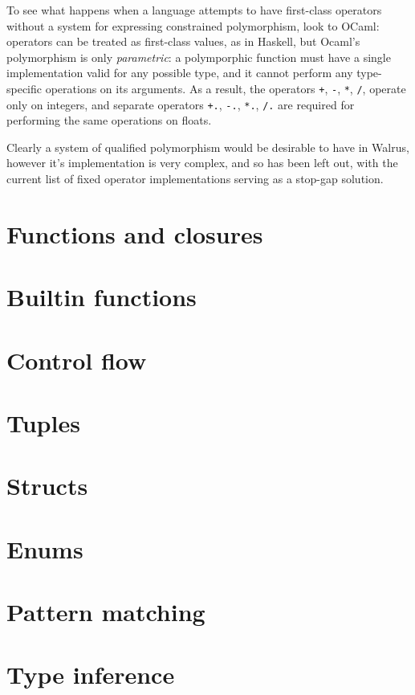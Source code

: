 To see what happens when a language attempts to have first-class operators without a system for expressing
constrained polymorphism, look to OCaml: operators can be treated as first-class values, as in Haskell,
but Ocaml's polymorphism is only \textit{parametric}: a polymporphic function must have a single
implementation valid for any possible type, and it cannot perform any type-specific operations
on its arguments. As a result, the operators \texttt{+}, \texttt{-}, \texttt{*}, \texttt{/}, operate
only on integers, and separate operators \texttt{+.}, \texttt{-.}, \texttt{*.}, \texttt{/.} are required
for performing the same operations on floats.

Clearly a system of qualified polymorphism would be desirable to have in Walrus, however it's implementation is very complex, and so has been
left out, with the current list of fixed operator implementations serving as a stop-gap solution.


\section{Functions and closures}\label{section:reference:functions_and_closures}
\section{Builtin functions}\label{section:reference:builtin_functions}
\section{Control flow}\label{section:reference:control_flow}
\section{Tuples}\label{section:reference:tuples}
\section{Structs}\label{section:reference:structs}
\section{Enums}\label{section:reference:enums}
\section{Pattern matching}\label{section:reference:pattern_matching}
\section{Type inference}\label{section:reference:type_inference}
